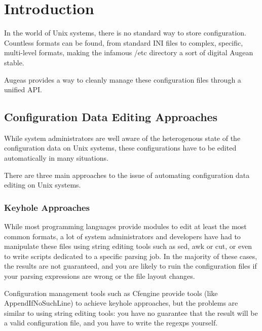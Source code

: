 \cleardoublepage
{}
{}
\chapter*{Introduction}


In the world of Unix systems, there is no standard way to store configuration. Countless formats can be found, from standard INI files to complex, specific, multi-level formats, making the infamous /etc directory a sort of digital Augean stable.

Augeas provides a way to cleanly manage these configuration files through a unified API.

\section{Configuration Data Editing Approaches}

While system administrators are well aware of the heterogenous state of the configuration data on Unix systems, these configurations have to be edited automatically in many situations.

There are three main approaches to the issue of automating configuration data editing on Unix systems.

\subsection{Keyhole Approaches}

While most programming languages provide modules to edit at least the most common formats, a lot of system administrators and developers have had to manipulate these files using string editing tools such as sed, awk or cut, or even to write scripts dedicated to a specific parsing job. In the majority of these cases, the results are not guaranteed, and you are likely to ruin the configuration files if your parsing expressions are wrong or the file layout changes.

Configuration management tools such as Cfengine provide tools (like AppendIfNoSuchLine) to achieve keyhole approaches, but the problems are similar to using string editing tools: you have no guarantee that the result will be a valid configuration file, and you have to write the regexps yourself.

